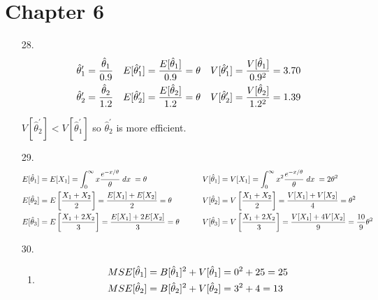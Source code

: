 \documentclass{article}
\def\prm{^\prime}
\def\dx{\; dx \;}
\begin{document}
\noindent
\begin{center}
\end{center}\vspace{0em}


\section*{Chapter 6}
\begin{enumerate}


\item[28.]
\begin{align}
	\hat\theta_1\prm &= \dfrac{\hat\theta_1}{0.9}
	& E[\hat\theta_1\prm] &= \dfrac{E[\hat\theta_1]}{0.9} = \theta
	& V[\hat\theta_1\prm] &= \dfrac{V[\hat\theta_1]}{0.9^2} = 3.70
	\notag\\
	\hat\theta_2\prm &= \dfrac{\hat\theta_2}{1.2}
	& E[\hat\theta_2\prm] &= \dfrac{E[\hat\theta_2]}{1.2} = \theta
	& V[\hat\theta_2\prm] &= \dfrac{V[\hat\theta_2]}{1.2^2} = 1.39
	\notag
\end{align}

$V[\hat\theta_2\prm] < V[\hat\theta_1\prm]$ so $\hat\theta_2\prm$ is more efficient.


\item[29.]
\begin{align}
	E[\hat\theta_1]
		&= E[X_1]
		= \int_0^\infty x \dfrac{e^{-x/\theta}}{\theta} \dx
		= \theta
	& V[\hat\theta_1]
		&= V[X_1]
		= \int_0^\infty x^2 \dfrac{e^{-x/\theta}}{\theta} \dx
		= 2 \theta^2
	\notag\\
	E[\hat\theta_2]
		&= E\left[\dfrac{X_1 + X_2}{2}\right]
		= \dfrac{E[X_1] + E[X_2]}{2}
		= \theta
	&\hspace{2em} V[\hat\theta_2]
		&= V\left[\dfrac{X_1 + X_2}{2}\right]
		= \dfrac{V[X_1] + V[X_2]}{4}
		= \theta^2
	\notag\\
	E[\hat\theta_3]
		&= E\left[\dfrac{X_1 + 2X_2}{3}\right]
		= \dfrac{E[X_1] + 2E[X_2]}{3}
		= \theta
	&\hspace{2em} V[\hat\theta_3]
		&= V\left[\dfrac{X_1 + 2X_2}{3}\right]
		= \dfrac{V[X_1] + 4V[X_2]}{9}
		= \dfrac{10}{9} \theta^2
	\notag
\end{align}


\item[30.]
\begin{enumerate}
\item
\begin{align}
	MSE[\hat\theta_1] &= B[\hat\theta_1]^2 + V[\hat\theta_1] = 0^2 + 25 = 25
	\notag\\
	MSE[\hat\theta_2] &= B[\hat\theta_2]^2 + V[\hat\theta_2] = 3^2 + 4 = 13
	\notag
\end{align}


\end{enumerate}
\end{enumerate}
\end{document}
